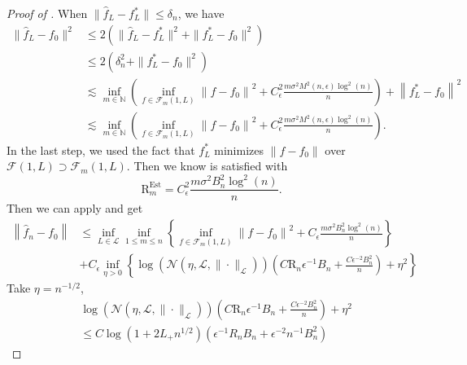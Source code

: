 \documentclass[12pt]{article}
\begin{document}
\begin{appendices}
\begin{proof}[Proof of ]
When $\|\widehat{f}_L - f_L^*\| \leq \delta_n$, we have
\begin{equation*}
\begin{aligned}
\|\widehat{f}_L - f_0\|^2 
& \leq 2\left( \|\widehat{f}_L - f_L^*\|^2 + \|f_L^* - f_0\|^2 \right) \\
& \leq 2 \left( \delta_n^2 + \|f_L^* - f_0\|^2 \right) \\
& \lesssim 
 \inf _{m \in \mathbb{N}}\left(\inf _{f \in \mathcal{F}_m(1, L)}\left\|f-f_0\right\|^2+C_{\epsilon}^2\frac{m \sigma^2 M^2(n, \epsilon)\log ^2\left(n \right)}{n}\right)+ \left\|f_L^*-f_0\right\|^2\\
& \lesssim \inf _{m \in \mathbb{N}}\left(\inf _{f \in \mathcal { F } _m ( 1 , L )}\left\|f-f_0\right\|^2+ C_{\epsilon}^2\frac{m \sigma^2 M^2(n, \epsilon)\log ^2\left(n\right)}{n}\right).
\end{aligned}
\end{equation*}
In the last step, we used the fact that $f_L^*$ minimizes $\|f - f_0\|$ over $\mathcal{F}(1,L)\supset \mathcal{F}_{m}(1,L)$. Then we know   is satisfied with 
\begin{equation*}
\mathrm{R}_m^{\mathrm{Est}}  = C_\epsilon^2 \frac{m \sigma^2 B_n^2 \log ^2(n)}{ n}.
\end{equation*}
Then we can apply  and get
\begin{equation*}
\begin{aligned}
   \left\|\widehat{f}_n-f_0\right\| 
    & \leq \inf_{L \in \mathcal{L}} \inf _{1 \leq m \leq n}\left\{\inf _{f \in \mathcal{F}_m(1, L)}\left\|f-f_0\right\|^2+ C_\epsilon \frac{m \sigma^2 B_n^2 \log ^2\left(n\right)}{n} \right\}\\
   & + C_\epsilon \inf _{\eta>0}\left\{\log \left(\mathcal{N}\left(\eta, \mathcal{L},\|\cdot\|_{\mathcal{L}}\right)\right)\left(C\mathrm{R}_n \epsilon^{-1}B_n+\frac{C\epsilon^{-2}B_n^2}{n}\right)+\eta^2\right\} 
\end{aligned}
\end{equation*}
Take $\eta = n^{-1/2}$,
\begin{equation*}
\begin{aligned}
   &\log \left(\mathcal{N}\left(\eta, \mathcal{L},\|\cdot\|_{\mathcal{L}}\right)\right)\left(C \mathrm{R}_n \epsilon^{-1} B_n+\frac{C \epsilon^{-2} B_n^2}{n}\right)+\eta^2\\
    &\leq C\log(1+2L_+ n^{1/2})(\epsilon^{-1}R_nB_n + \epsilon^{-2}n^{-1}B_n^2)
\end{aligned}
\end{equation*}
\end{proof}




\end{appendices}
\end{document}
